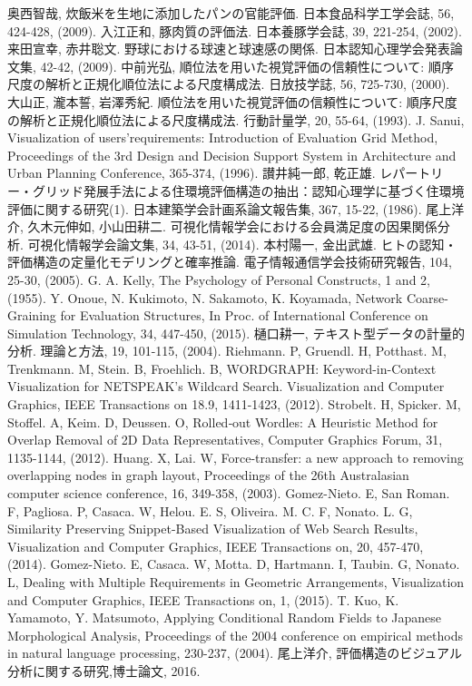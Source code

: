 \documentclass[syuuron]{kuee}
\begin{document}
\begin{thebibliography}{数字}
	 奥西智哉, 炊飯米を生地に添加したパンの官能評価. 日本食品科学工学会誌, 56, 424-428, (2009).
	 入江正和, 豚肉質の評価法. 日本養豚学会誌, 39, 221-254, (2002).
	 来田宣幸, 赤井聡文. 野球における球速と球速感の関係. 日本認知心理学会発表論文集, 42-42, (2009).
	 中前光弘, 順位法を用いた視覚評価の信頼性について: 順序尺度の解析と正規化順位法による尺度構成法. 日放技学誌, 56, 725-730, (2000).
	 大山正, 瀧本誓, 岩澤秀紀. 順位法を用いた視覚評価の信頼性について: 順序尺度の解析と正規化順位法による尺度構成法. 行動計量学, 20, 55-64, (1993).
	 J. Sanui, Visualization of users’requirements: Introduction of Evaluation Grid Method, Proceedings of the 3rd Design and Decision Support System in Architecture and Urban Planning Conference, 365-374, (1996).
	 讃井純一郎, 乾正雄. レパートリー・グリッド発展手法による住環境評価構造の抽出：認知心理学に基づく住環境評価に関する研究(1). 日本建築学会計画系論文報告集, 367, 15-22, (1986).
	 尾上洋介, 久木元伸如, 小山田耕二. 可視化情報学会における会員満足度の因果関係分析. 可視化情報学会論文集, 34, 43-51, (2014).
	 本村陽一, 金出武雄. ヒトの認知・評価構造の定量化モデリングと確率推論. 電子情報通信学会技術研究報告, 104, 25-30, (2005).
	 G. A. Kelly, The Psychology of Personal Constructs, 1 and 2, (1955).
	 Y. Onoue, N. Kukimoto, N. Sakamoto, K. Koyamada, Network Coarse-Graining for Evaluation Structures, In Proc. of International Conference on Simulation Technology, 34, 447-450, (2015). 
	 樋口耕一, テキスト型データの計量的分析. 理論と方法, 19, 101-115, (2004).
	 Riehmann. P, Gruendl. H, Potthast. M, Trenkmann. M, Stein. B, Froehlich. B, WORDGRAPH: Keyword-in-Context Visualization for NETSPEAK's Wildcard Search. Visualization and Computer Graphics, IEEE Transactions on 18.9, 1411-1423, (2012).
	 Strobelt. H, Spicker. M, Stoffel. A, Keim. D, Deussen. O, Rolled‐out Wordles: A Heuristic Method for Overlap Removal of 2D Data Representatives, Computer Graphics Forum, 31, 1135-1144, (2012).
	 Huang. X, Lai. W, Force-transfer: a new approach to removing overlapping nodes in graph layout, Proceedings of the 26th Australasian computer science conference, 16, 349-358, (2003).
	 Gomez-Nieto. E, San Roman. F, Pagliosa. P, Casaca. W, Helou. E. S, Oliveira. M. C. F, Nonato. L. G, Similarity Preserving Snippet-Based Visualization of Web Search Results, Visualization and Computer Graphics, IEEE Transactions on, 20, 457-470, (2014).
	 Gomez-Nieto. E, Casaca. W, Motta. D, Hartmann. I, Taubin. G, Nonato. L, Dealing with Multiple Requirements in Geometric Arrangements, Visualization and Computer Graphics, IEEE Transactions on, 1, (2015).
	 T. Kuo, K. Yamamoto, Y. Matsumoto, Applying Conditional Random Fields to Japanese Morphological Analysis, Proceedings of the 2004 conference on empirical methods in natural language processing, 230-237, (2004).
	 尾上洋介, 評価構造のビジュアル分析に関する研究,博士論文, 2016.
\end{thebibliography}

\appendix
\end{document}

